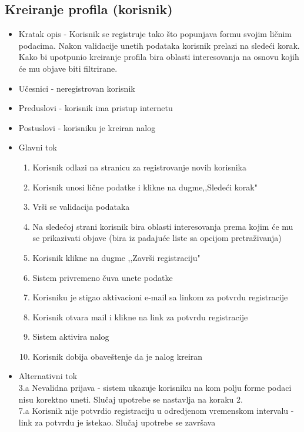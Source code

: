 \subsection{Kreiranje profila (korisnik)}
\begin{itemize}
\item Kratak opis - Korisnik se registruje tako što popunjava formu svojim ličnim podacima. Nakon validacije unetih podataka korisnik prelazi na sledeći korak. Kako bi upotpunio kreiranje profila bira oblasti interesovanja na osnovu kojih će mu objave biti filtrirane.
\item Učesnici - neregistrovan korisnik
\item Preduslovi - korisnik ima pristup internetu
\item Postuslovi - korisniku je kreiran nalog
\item Glavni tok
\begin{enumerate}
\item Korisnik odlazi na stranicu za registrovanje novih korisnika
\item Korisnik unosi lične podatke i klikne na dugme,,Sledeći korak"
\item Vrši se validacija podataka
\item Na sledećoj strani korisnik bira oblasti interesovanja prema kojim će mu se prikazivati objave (bira iz padajuće liste sa opcijom pretraživanja)
\item Korisnik klikne na dugme ,,Završi registraciju"
\item Sistem privremeno čuva unete podatke
\item Korisniku je stigao aktivacioni e-mail sa linkom za potvrdu registracije
\item Korisnik otvara mail i klikne na link za potvrdu registracije
\item Sistem aktivira nalog
\item Korisnik dobija obaveštenje da je nalog kreiran
\end{enumerate}
\item Alternativni tok \\
3.a Nevalidna prijava - sistem ukazuje korisniku na kom polju forme podaci nisu korektno uneti. Slučaj upotrebe se nastavlja na koraku 2. \\
7.a Korisnik nije potvrdio registraciju u odredjenom vremenskom intervalu - link za potvrdu je istekao. Slučaj upotrebe se završava
\end{itemize}

